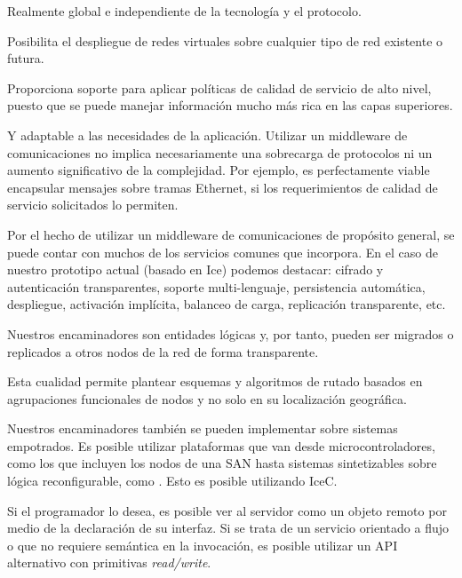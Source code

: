 \documentclass{arco-article}
\newcommand{\fg}[1]{\textit{#1}}
\def \mw {middleware}
\begin{document}
\begin{definitionlist}
\item[Direccionamiento] Realmente global e independiente de la
  tecnología y el protocolo.

\item[Red virtual] Posibilita el despliegue de redes virtuales sobre
  cualquier tipo de red existente o futura.

\item[Calidad de servicio] Proporciona soporte para aplicar políticas
  de calidad de servicio de alto nivel, puesto que se puede manejar
  información mucho más rica en las capas superiores.

\item[Flexible] Y adaptable a las necesidades de la
  aplicación. Utilizar un \mw{} de comunicaciones no implica
  necesariamente una sobrecarga de protocolos ni un aumento
  significativo de la complejidad.  Por ejemplo, es perfectamente
  viable encapsular mensajes sobre tramas Ethernet, si los
  requerimientos de calidad de servicio solicitados lo permiten.

\item[Servicios de la plataforma] Por el hecho de utilizar un \mw{} de
  comunicaciones de propósito general, se puede contar con muchos de
  los servicios comunes que incorpora. En el caso de nuestro prototipo
  actual (basado en \ac{Ice}) podemos destacar: cifrado y autenticación
  transparentes, soporte multi-lenguaje, persistencia automática,
  despliegue, activación implícita, balanceo de carga, replicación
  transparente, etc.

\item[Transparencia de localización] Nuestros encaminadores son
  entidades lógicas y, por tanto, pueden ser migrados o replicados a
  otros nodos de la red de forma transparente.

\item[Encaminamiento funcional] Esta cualidad permite plantear
  esquemas y algoritmos de rutado basados en agrupaciones funcionales
  de nodos y no solo en su localización geográfica.

\item[Eficiencia] Nuestros encaminadores también se pueden implementar
  sobre sistemas empotrados. Es posible utilizar plataformas que van
  desde microcontroladores, como los que incluyen los nodos de una
  \ac{SAN} hasta sistemas sintetizables sobre lógica reconfigurable,
  como . Esto es posible utilizando IceC.

\item[Orientado a Objetos] Si el programador lo desea, es posible ver
  al servidor como un objeto remoto por medio de la declaración de su
  interfaz.  Si se trata de un servicio orientado a flujo o que no
  requiere semántica en la invocación, es posible utilizar un \ac{API}
  alternativo con primitivas \fg{read/write}.
\end{definitionlist}
\end{document}
